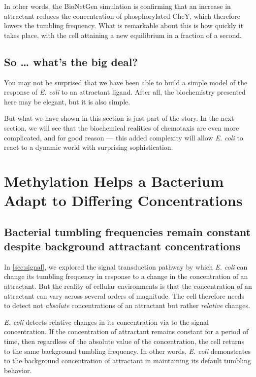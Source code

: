 In other words, the BioNetGen simulation is confirming that an increase in attractant reduces the concentration of phosphorylated CheY, which therefore lowers the tumbling frequency. What is remarkable about this is how quickly it takes place, with the cell attaining a new equilibrium in a fraction of a second.


\FloatBarrier
{}
{}
\subsection{So … what's the big deal?}

You may not be surprised that we have been able to build a simple model of the response of \textit{E. coli} to an attractant ligand. After all, the biochemistry presented here may be elegant, but it is also simple.

But what we have shown in this section is just part of the story. In the next section, we will see that the biochemical realities of chemotaxis are even more complicated, and for good reason --- this added complexity will allow \textit{E. coli} to react to a dynamic world with surprising sophistication.



\FloatBarrier
{}

\section{Methylation Helps a Bacterium Adapt to Differing Concentrations}
\label{sec:methylation}

\subsection{Bacterial tumbling frequencies remain constant despite background attractant concentrations}


In \autoref{sec:signal}, we explored the signal transduction pathway by which \textit{E. coli} can change its tumbling frequency in response to a change in the concentration of an attractant. But the reality of cellular environments is that the concentration of an attractant can vary across several orders of magnitude. The cell therefore needs to detect not \textit{absolute} concentrations of an attractant but rather \textit{relative} changes.

\textit{E. coli} detects relative changes in its concentration via  to the signal concentration. If the concentration of attractant remains constant for a period of time, then regardless of the absolute value of the concentration, the cell returns to the same background tumbling frequency. In other words, \textit{E. coli} demonstrates  to the background concentration of attractant in maintaining its default tumbling behavior.

